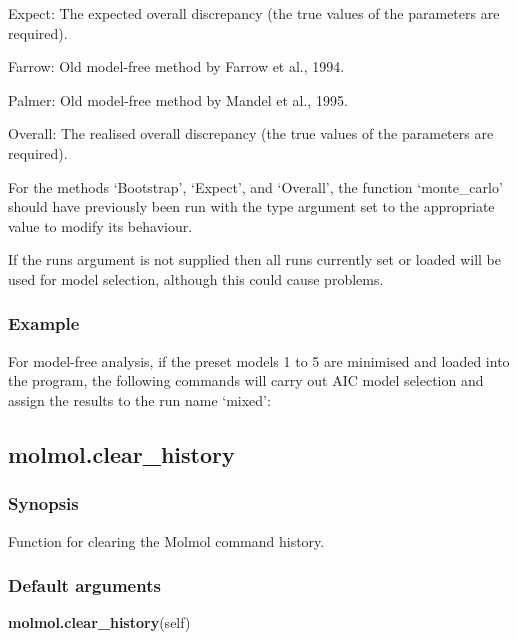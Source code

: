 Expect:  The expected overall discrepancy (the true values of the parameters are required).

Farrow:  Old model-free method by Farrow et al., 1994.

Palmer:  Old model-free method by Mandel et al., 1995.

Overall:  The realised overall discrepancy (the true values of the parameters are required).

For the methods `Bootstrap', `Expect', and `Overall', the function `monte\_carlo' should have
previously been run with the type argument set to the appropriate value to modify its
behaviour.

If the runs argument is not supplied then all runs currently set or loaded will be used for
model selection, although this could cause problems.


\subsubsection{Example}

For model-free analysis, if the preset models 1 to 5 are minimised and loaded into the
program, the following commands will carry out AIC model selection and assign the results
to the run name `mixed':





\newpage

\subsection{molmol.clear\_history}


\subsubsection{Synopsis}

Function for clearing the Molmol command history.

\subsubsection{Default arguments}

\textsf{\textbf{molmol.clear\_history}(self)}



\newpage

